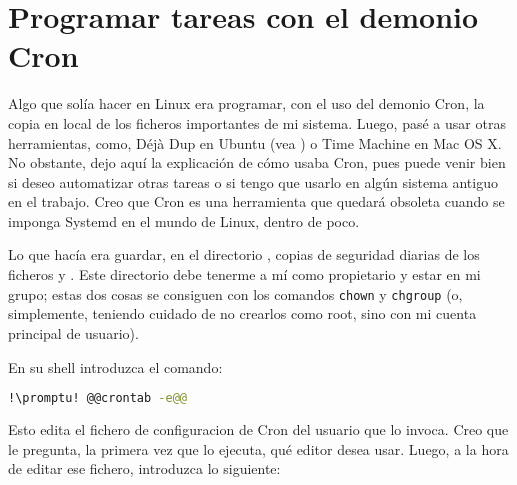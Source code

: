 \section{Programar tareas con el demonio Cron}\label{sec:cron}
Algo que solía hacer en Linux era programar, con el uso del demonio Cron, la copia en local de los ficheros
importantes de mi sistema. Luego, pasé a usar otras herramientas, como, Déjà Dup en Ubuntu (vea
) o Time Machine en Mac OS X. No obstante, dejo aquí la explicación de cómo usaba Cron,
pues puede venir bien si deseo automatizar otras tareas o si tengo que usarlo en algún sistema antiguo en el
trabajo. Creo que Cron es una herramienta que quedará obsoleta cuando se imponga Systemd en el mundo de Linux,
dentro de poco.

Lo que hacía era guardar, en el directorio , copias de seguridad diarias de los ficheros
 y . Este directorio debe tenerme a mí como propietario y estar en mi grupo; estas dos
cosas se consiguen con los comandos \lstinline+chown+ y \lstinline+chgroup+ (o, simplemente, teniendo cuidado de
no crearlos como root, sino con mi cuenta principal de usuario).

En su shell introduzca el comando:

\begin{lstlisting}[gobble=2,language=bash,style=bashinteract,escapechar=!]
  !\promptu! @@crontab -e@@
\end{lstlisting}

\noindent Esto edita el fichero de configuracion de Cron del usuario que lo invoca. Creo que le pregunta, la
primera vez que lo ejecuta, qué editor desea usar. Luego, a la hora de editar ese fichero, introduzca lo
siguiente:

